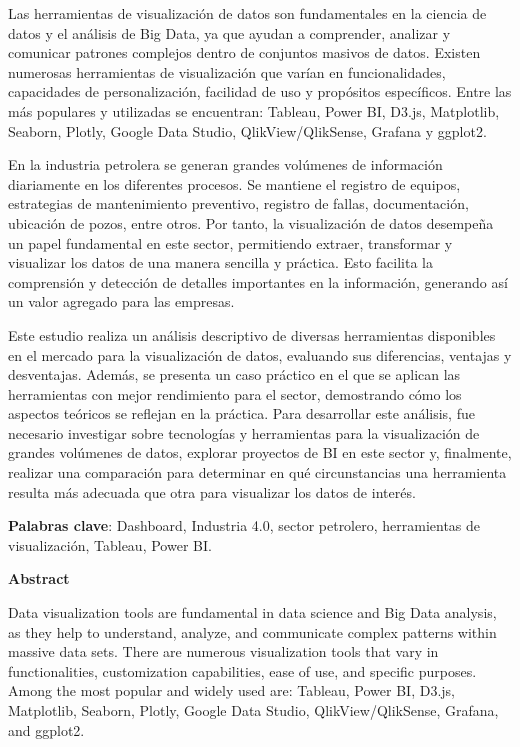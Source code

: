 \documentclass[
  11pt,
  bookmarksnumbered]{article}
\begin{document}
Las herramientas de visualización de datos son fundamentales en la ciencia de datos y el análisis de Big Data, ya que ayudan a comprender, analizar y comunicar patrones complejos dentro de conjuntos masivos de datos.
Existen numerosas herramientas de visualización que varían en funcionalidades, capacidades de personalización, facilidad de uso y propósitos específicos.
Entre las más populares y utilizadas se encuentran: Tableau, Power BI, D3.js, Matplotlib, Seaborn, Plotly, Google Data Studio, QlikView/QlikSense, Grafana y ggplot2.

En la industria petrolera se generan grandes volúmenes de información diariamente en los diferentes procesos.
Se mantiene el registro de equipos, estrategias de mantenimiento preventivo, registro de fallas, documentación, ubicación de pozos, entre otros.
Por tanto, la visualización de datos desempeña un papel fundamental en este sector, permitiendo extraer, transformar y visualizar los datos de una manera sencilla y práctica.
Esto facilita la comprensión y detección de detalles importantes en la información, generando así un valor agregado para las empresas.

Este estudio realiza un análisis descriptivo de diversas herramientas disponibles en el mercado para la visualización de datos, evaluando sus diferencias, ventajas y desventajas.
Además, se presenta un caso práctico en el que se aplican las herramientas con mejor rendimiento para el sector, demostrando cómo los aspectos teóricos se reflejan en la práctica.
Para desarrollar este análisis, fue necesario investigar sobre tecnologías y herramientas para la visualización de grandes volúmenes de datos, explorar proyectos de BI en este sector y, finalmente, realizar una comparación para determinar en qué circunstancias una herramienta resulta más adecuada que otra para visualizar los datos de interés.

\textbf{Palabras clave}: Dashboard, Industria 4.0, sector petrolero, herramientas de visualización, Tableau, Power BI.

\newpage

\begin{center}
\textbf{Abstract}
\end{center}

Data visualization tools are fundamental in data science and Big Data analysis, as they help to understand, analyze, and communicate complex patterns within massive data sets.
There are numerous visualization tools that vary in functionalities, customization capabilities, ease of use, and specific purposes.
Among the most popular and widely used are: Tableau, Power BI, D3.js, Matplotlib, Seaborn, Plotly, Google Data Studio, QlikView/QlikSense, Grafana, and ggplot2.
\end{document}
